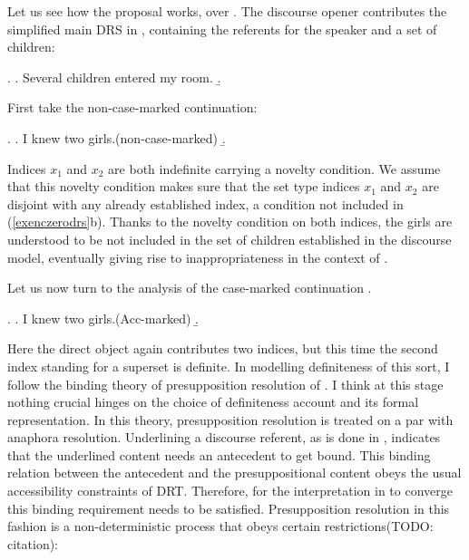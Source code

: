 \documentclass[11pt,a4paper]{article}
\begin{document}
Let us see how the proposal works, over . The discourse opener
 contributes the simplified main DRS in ,
containing the referents for the speaker and a set of children:

\ex.\label{exencmaindrs}
\a. Several children entered my room.
\b. 

First take the non-case-marked continuation:

\ex.\label{exenczerodrs}
\a. I knew two girls.\hfill (non-case-marked)
\b.

Indices $x_1$ and $x_2$ are both indefinite carrying a novelty condition. We
assume that this novelty condition makes sure that the set type indices $x_1$
and $x_2$ are disjoint with any already established index, a condition not
included in (\ref{exenczerodrs}b).  Thanks to the novelty condition on both
indices, the girls are understood to be not included in the set of children
established in the discourse model, eventually giving rise to inappropriateness
in the context of .

Let us now turn to the analysis of the case-marked continuation
.

\ex.\label{exencacc1}
\a. I knew two girls.\hfill (Acc-marked)
\b. 

Here the direct object  again contributes two
indices, but this time the second index standing for a superset is definite. In
modelling definiteness of this sort, I follow the binding theory of
presupposition resolution of . I think at this stage nothing
crucial hinges on the choice of definiteness account and its formal
representation. In this theory, presupposition resolution is treated on a par
with anaphora resolution. Underlining a discourse referent, as is done in
, indicates that the underlined content needs an antecedent to
get bound. This binding relation between the antecedent and the
presuppositional content obeys the usual accessibility constraints of DRT.
Therefore, for the interpretation in  to converge this binding
requirement needs to be satisfied. Presupposition resolution in this fashion is
a non-deterministic process that obeys certain restrictions(TODO:
citation):
\end{document}
